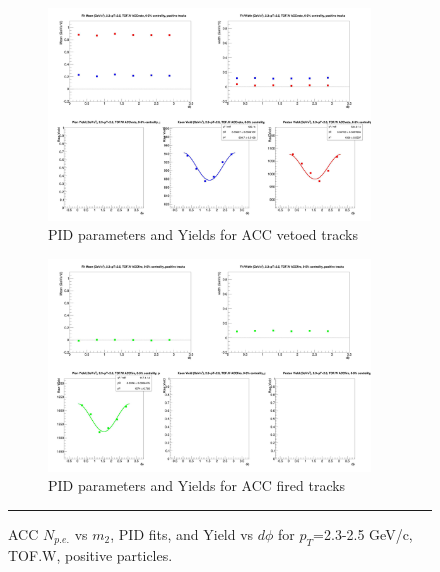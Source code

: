 \begin{figure}[H]
  \ContinuedFloat
    \vspace*{-1cm}
    \begin{subfigure}{1\textwidth}
   \centering
   \includegraphics[width=0.94\textwidth]{hiptfits/pos/fitParams_tof2_cent0_ch1_pT-23-25.jpg}
    \caption{PID parameters and Yields for ACC vetoed tracks}
    \end{subfigure}    
    \begin{subfigure}{1\textwidth}
   \centering
   \includegraphics[width=0.94\textwidth]{hiptfits/pos/fitParams_tof3_cent0_ch1_pT-23-25.jpg}
    \caption{PID parameters and Yields for ACC fired tracks}
    \end{subfigure} 
    \rule{35em}{0.5pt}
  \caption[ACC $N_{p.e.}$ vs $m_2$, PID fits, and Yield vs $d\phi$ for $p_T$=2.3-2.5 GeV/c, TOF.W, positive particles.]{ACC $N_{p.e.}$ vs $m_2$, PID fits, and Yield vs $d\phi$ for $p_T$=2.3-2.5 GeV/c, TOF.W, positive particles.}
  \label{fig:acc23-25pos}
\end{figure}



